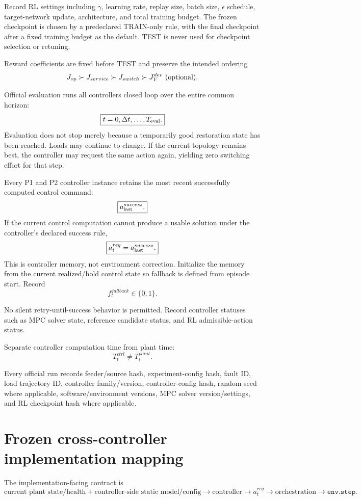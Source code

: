 \documentclass[11pt]{article}
\begin{document}
Record RL settings including $\gamma$, learning rate, replay size, batch size,
$\epsilon$ schedule, target-network update, architecture, and total training budget.
The frozen checkpoint is chosen by a predeclared TRAIN-only rule, with the final
checkpoint after a fixed training budget as the default. TEST is never used for
checkpoint selection or retuning.

Reward coefficients are fixed before TEST and preserve the intended ordering
\[
J_{op}\succ J_{service}\succ J_{switch}\succ J_V^{dev}\ {\rm(optional)}.
\]

Official evaluation runs all controllers closed loop over the entire common horizon:
\[
\boxed{t=0,\Delta t,\dots,T_{\rm eval}.}
\]
Evaluation does not stop merely because a temporarily good restoration state has been
reached. Loads may continue to change. If the current topology remains best, the
controller may request the same action again, yielding zero switching effort for that
step.

Every P1 and P2 controller instance retains the most recent successfully computed control
command:
\[
\boxed{a_{\rm last}^{success}.}
\]
If the current control computation cannot produce a usable solution under the
controller's declared success rule,
\[
\boxed{a_t^{req}=a_{\rm last}^{success}.}
\]
This is controller memory, not environment correction. Initialize the memory from the
current realized/hold control state so fallback is defined from episode start. Record
\[
f_t^{fallback}\in\{0,1\}.
\]

No silent retry-until-success behavior is permitted. Record controller statuses such as
MPC solver state, reference candidate status, and RL admissible-action status.

Separate controller computation time from plant time:
\[
T_t^{ctrl}\neq T_t^{plant}.
\]

Every official run records feeder/source hash, experiment-config hash, fault ID, load
trajectory ID, controller family/version, controller-config hash, random seed where
applicable, software/environment versions, MPC solver version/settings, and RL
checkpoint hash where applicable.

\section{Frozen cross-controller implementation mapping}
The implementation-facing contract is
\[
\boxed{
\text{current plant state/health}
+
\text{controller-side static model/config}
\rightarrow
\text{controller}
\rightarrow
a_t^{req}
\rightarrow
\text{orchestration}
\rightarrow
\texttt{env.step}.}
\]
\end{document}
